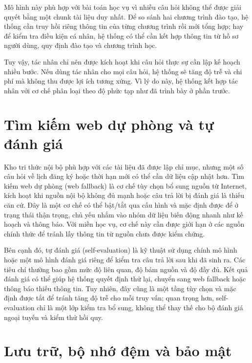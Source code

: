 \documentclass[../DoAn.tex]{subfiles}
\begin{document}
Mô hình này phù hợp với bài toán học vụ vì nhiều câu hỏi không thể được giải
quyết bằng một chunk tài liệu duy nhất. Để so sánh hai chương trình đào tạo,
hệ thống cần truy hồi riêng thông tin của từng chương trình rồi mới tổng hợp;
hay để kiểm tra điều kiện cá nhân, hệ thống có thể cần kết hợp thông tin từ
hồ sơ người dùng, quy định đào tạo và chương trình học.

Tuy vậy, tác nhân chỉ nên được kích hoạt khi câu hỏi thực sự cần lập kế hoạch
nhiều bước. Nếu dùng tác nhân cho mọi câu hỏi, hệ thống sẽ tăng độ trễ và chi
phí mà không thu được lợi ích tương xứng. Vì lý do này, hệ thống kết hợp tác
nhân với cơ chế phân loại theo độ phức tạp như đã trình bày ở phần trước.

\section{Tìm kiếm web dự phòng và tự đánh giá}

Kho tri thức nội bộ phù hợp với các tài liệu đã được lập chỉ mục, nhưng một
số câu hỏi về lịch đăng ký hoặc thời hạn mới có thể cần dữ liệu cập nhật hơn.
Tìm kiếm web dự phòng (web fallback) là cơ chế tùy chọn bổ sung nguồn từ
Internet, kích hoạt khi nguồn nội bộ không đủ mạnh hoặc câu trả lời bị đánh giá
là thiếu căn cứ. Đây là một cơ chế có thể bật/tắt qua cấu hình và mặc định được
để ở trạng thái thận trọng, chủ yếu nhắm vào nhóm dữ liệu biến động nhanh như
kế hoạch và thông báo. Với miền học vụ, cơ chế này cần được giới hạn ở các nguồn
chính thức để tránh lấy thông tin từ nguồn chưa được kiểm chứng.

Bên cạnh đó, tự đánh giá (self-evaluation) là kỹ thuật sử dụng chính mô hình
hoặc một mô hình đánh giá riêng để kiểm tra câu trả lời sau khi đã sinh ra.
Các tiêu chí thường bao gồm mức độ liên quan, độ bám nguồn và độ đầy đủ. Kết
quả đánh giá có thể giúp hệ thống quyết định thử lại, chuyển sang web fallback
hoặc thông báo thiếu thông tin. Tuy nhiên, đây cũng là một tầng tùy chọn và mặc
định được tắt để tránh tăng độ trễ cho mỗi truy vấn; quan trọng hơn,
self-evaluation chỉ là một lớp kiểm tra bổ sung, không thể thay thế cho bộ đánh
giá ngoại tuyến và kiểm thử hồi quy.

\section{Lưu trữ, bộ nhớ đệm và bảo mật}
\end{document}
